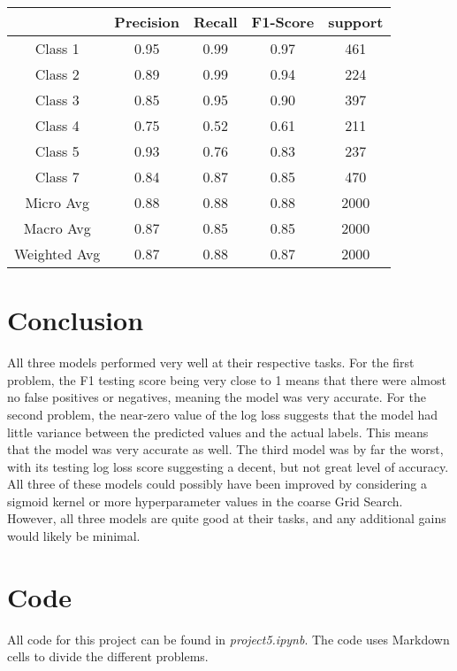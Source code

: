 \documentclass[12pt]{article}
\begin{document}
    \begin{center}
    	\begin{tabular}{| c | c | c | c | c |}
    		\hline
    		& Precision & Recall & F1-Score & support \\ \hline
    		Class 1 & 0.95 & 0.99 & 0.97 & 461 \\ \hline
    		Class 2 & 0.89 & 0.99 & 0.94 & 224 \\ \hline
    		Class 3 & 0.85 & 0.95 & 0.90 & 397 \\ \hline
    		Class 4 & 0.75 & 0.52 & 0.61 & 211 \\ \hline
    		Class 5 & 0.93 & 0.76 & 0.83 & 237 \\ \hline
    		Class 7 & 0.84 & 0.87 & 0.85 & 470 \\ \hline
    		Micro Avg & 0.88 & 0.88 & 0.88 & 2000 \\ \hline
    		Macro Avg & 0.87 & 0.85 & 0.85 & 2000 \\ \hline
    		Weighted Avg & 0.87 & 0.88 & 0.87 & 2000 \\ \hline
    	\end{tabular}
    \end{center}

    \section{Conclusion}
    All three models performed very well at their respective tasks. For the first problem, the F1 testing score being very close to 1 means that there were almost no false positives or negatives, meaning the model was very accurate. For the second problem, the near-zero value of the log loss suggests that the model had little variance between the predicted values and the actual labels. This means that the model was very accurate as well. The third model was by far the worst, with its testing log loss score suggesting a decent, but not great level of accuracy. All three of these models could possibly have been improved by considering a sigmoid kernel or more hyperparameter values in the coarse Grid Search. However, all three models are quite good at their tasks, and any additional gains would likely be minimal.
    
    \section{Code}
    All code for this project can be found in \textit{project5.ipynb}. The code uses Markdown cells to divide the different problems.
	
\end{document}
